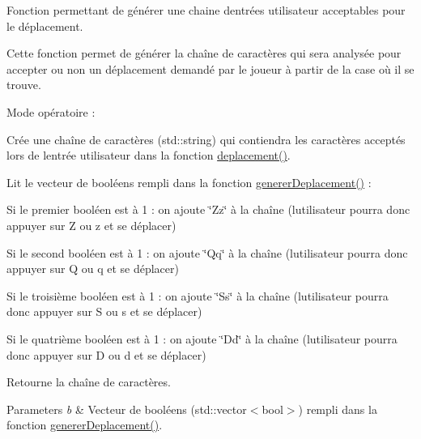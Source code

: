 Fonction permettant de générer une chaine d\textquotesingle{}entrées utilisateur acceptables pour le déplacement. 

Cette fonction permet de générer la chaîne de caractères qui sera analysée pour accepter ou non un déplacement demandé par le joueur à partir de la case où il se trouve.

Mode opératoire \+:
\begin{DoxyItemize}
\item Crée une chaîne de caractères ({\ttfamily std\+::string}) qui contiendra les caractères acceptés lors de l\textquotesingle{}entrée utilisateur dans la fonction {\ttfamily \hyperlink{classjeu_a852b0a8b2d17f0af120c6798861ef806}{deplacement()}}.
\item Lit le vecteur de booléens rempli dans la fonction {\ttfamily \hyperlink{classjeu_a58d74300f8d64b3d3cd151e0838ef232}{generer\+Deplacement()}} \+:
\begin{DoxyItemize}
\item Si le premier booléen est à 1 \+: on ajoute \char`\"{}\+Zz\char`\"{} à la chaîne (l\textquotesingle{}utilisateur pourra donc appuyer sur \textquotesingle{}Z\textquotesingle{} ou \textquotesingle{}z\textquotesingle{} et se déplacer)
\item Si le second booléen est à 1 \+: on ajoute \char`\"{}\+Qq\char`\"{} à la chaîne (l\textquotesingle{}utilisateur pourra donc appuyer sur \textquotesingle{}Q\textquotesingle{} ou \textquotesingle{}q\textquotesingle{} et se déplacer)
\item Si le troisième booléen est à 1 \+: on ajoute \char`\"{}\+Ss\char`\"{} à la chaîne (l\textquotesingle{}utilisateur pourra donc appuyer sur \textquotesingle{}S\textquotesingle{} ou \textquotesingle{}s\textquotesingle{} et se déplacer)
\item Si le quatrième booléen est à 1 \+: on ajoute \char`\"{}\+Dd\char`\"{} à la chaîne (l\textquotesingle{}utilisateur pourra donc appuyer sur \textquotesingle{}D\textquotesingle{} ou \textquotesingle{}d\textquotesingle{} et se déplacer)
\end{DoxyItemize}
\item Retourne la chaîne de caractères. 
\begin{DoxyParams}{Parameters}
{\em b} & Vecteur de booléens ({\ttfamily std\+::vector$<$bool$>$}) rempli dans la fonction {\ttfamily \hyperlink{classjeu_a58d74300f8d64b3d3cd151e0838ef232}{generer\+Deplacement()}}. \\
\hline
\end{DoxyParams}

\end{DoxyItemize}
